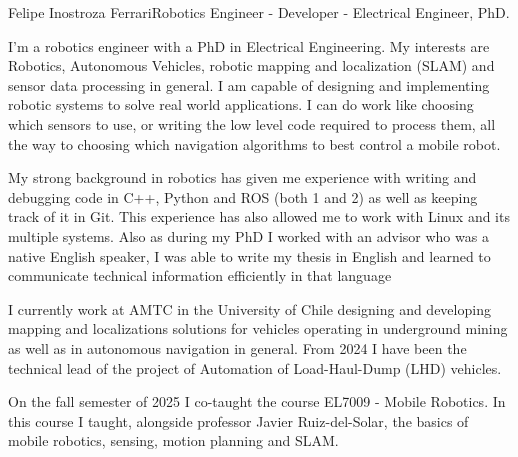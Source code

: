 \documentclass{article}
\begin{document}
\begin{cv}[avatar]{Felipe Inostroza Ferrari}{Robotics Engineer - Developer - Electrical Engineer, PhD.}



	I'm a robotics engineer with a PhD in Electrical Engineering. My interests are Robotics, Autonomous Vehicles, robotic mapping and localization (SLAM) and sensor data processing in general.
	I am capable of designing and implementing robotic systems to solve real world applications. I can do work like choosing which sensors to use, or  writing the low level code required to process them, all the way to choosing which navigation algorithms to best control a mobile robot.

	My strong background in robotics has given me experience with writing and debugging code in C++, Python and ROS (both 1 and 2) as well as keeping track of it in Git.
	This experience has also allowed me to work with Linux and its multiple systems.
	Also as during my PhD I worked with an advisor who was a native English speaker, I was able to write my thesis in English and learned to communicate technical information efficiently in that language


	\begin{cvevent}[2019][present]
		I currently work at AMTC in the University of Chile designing and developing mapping and localizations solutions for vehicles operating in underground mining as well as in autonomous navigation in general.
		From 2024 I have been the technical lead of the project of Automation of Load-Haul-Dump (LHD) vehicles.
	\end{cvevent}

	\begin{cvevent}[2025][present]
		On the fall semester of 2025 I co-taught the course EL7009 - Mobile Robotics.
		In this course I taught, alongside professor Javier Ruiz-del-Solar, the basics of mobile robotics, sensing, motion planning and SLAM.
	\end{cvevent}



\end{cv}
\end{document}
